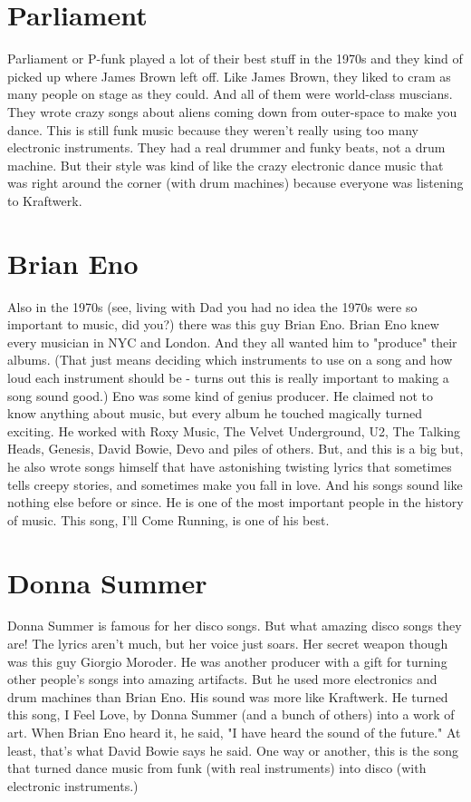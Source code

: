 \documentclass[letterpaper,12pt,single]{article}
\begin{document}
\section{Parliament}

Parliament or P-funk played a lot of their best stuff in the 1970s and they kind of picked up where James Brown left off. Like James Brown, they liked to cram as many people on stage as they could. And all of them were world-class muscians. They wrote crazy songs about aliens coming down from outer-space to make you dance. This is still funk music because they weren't really using too many electronic instruments. They had a real drummer and funky beats, not a drum machine. But their style was kind of like the crazy electronic dance music that was right around the corner (with drum machines) because everyone was listening to Kraftwerk.

\section{Brian Eno}

Also in the 1970s (see, living with Dad you had no idea the 1970s were so important to music, did you?) there was this guy Brian Eno. Brian Eno knew every musician in NYC and London. And they all wanted him to "produce" their albums. (That just means deciding which instruments to use on a song and how loud each instrument should be - turns out this is really important to making a song sound good.) Eno was some kind of genius producer. He claimed not to know anything about music, but every album he touched magically turned exciting. He worked with Roxy Music, The Velvet Underground, U2, The Talking Heads, Genesis, David Bowie, Devo and piles of others. But, and this is a big but, he also wrote songs himself that have astonishing twisting lyrics that sometimes tells creepy stories, and sometimes make you fall in love. And his songs sound like nothing else before or since. He is one of the most important people in the history of music. This song, I'll Come Running, is one of his best.

\section{Donna Summer}

Donna Summer is famous for her disco songs. But what amazing disco songs they are! The lyrics aren't much, but her voice just soars. Her secret weapon though was this guy Giorgio Moroder. He was another producer with a gift for turning other people's songs into amazing artifacts. But he used more electronics and drum machines than Brian Eno. His sound was more like Kraftwerk. He turned this song, I Feel Love, by Donna Summer (and a bunch of others) into a work of art. When Brian Eno heard it, he said, "I have heard the sound of the future." At least, that's what David Bowie says he said. One way or another, this is the song that turned dance music from funk (with real instruments) into disco (with electronic instruments.)
\end{document}
